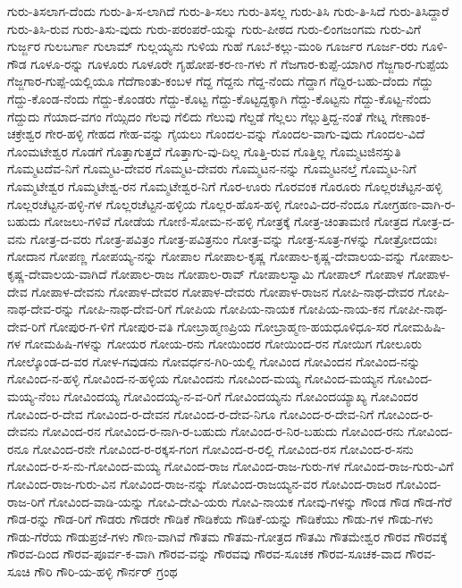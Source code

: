 {ಗುರು-ತಿಸಲಾಗ-ದೆಂದು
ಗುರು-ತಿ-ಸ-ಲಾಗಿದೆ
ಗುರು-ತಿ-ಸಲು
ಗುರು-ತಿಸಲ್ಲ
ಗುರು-ತಿಸಿ
ಗುರು-ತಿ-ಸಿದೆ
ಗುರು-ತಿಸಿದ್ದಾರೆ
ಗುರು-ತಿಸಿ-ರುವ
ಗುರು-ತಿಸು-ವುದು
ಗುರು-ಪರಂಪರೆ-ಯನ್ನು
ಗುರು-ಪೀಠದ
ಗುರು-ಲಿಂಗಜಂಗಮ
ಗುರು-ವಿಗೆ
ಗುರ್ಜ್ಜರ
ಗುಲಬರ್ಗಾ
ಗುಲಾಮ್
ಗುಲ್ಲಯ್ಯನು
ಗುಳಿಯ
ಗುಹೆ
ಗೂಬೆ-ಕಲ್ಲು-ಮಂಠಿ
ಗೂರ್ಜರ
ಗೂರ್ಜ-ರರು
ಗೂಳಿ-ಗೌಡ
ಗೂಳೂ-ರನ್ನು
ಗೂಳೂರು
ಗೂಳೂರೇ
ಗೃಹೋಪ-ಕರ-ಣ-ಗಳು
ಗೆ
ಗೆಜಗಾರ-ಕುಪ್ಪೆ-ಯಾಗಿರ
ಗೆಜ್ಜಗಾರ-ಗುಪ್ಪೆಯ
ಗೆಜ್ಜಗಾರ-ಗುಪ್ಪೆ-ಯಲ್ಲಿಯೂ
ಗೆದೆಗಾಂತು-ಕಂಬಳ
ಗೆದ್ದ
ಗೆದ್ದನು
ಗೆದ್ದ-ನೆಂದು
ಗೆದ್ದಾಗ
ಗೆದ್ದಿರ-ಬಹು-ದೆಂದು
ಗೆದ್ದು
ಗೆದ್ದು-ಕೊಂಡ-ನೆಂದು
ಗೆದ್ದು-ಕೊಂಡರು
ಗೆದ್ದು-ಕೊಟ್ಟ
ಗೆದ್ದು-ಕೊಟ್ಟದ್ದಕ್ಕಾಗಿ
ಗೆದ್ದು-ಕೊಟ್ಟನು
ಗೆದ್ದು-ಕೊಟ್ಟ-ನೆಂದು
ಗೆದ್ದುದು
ಗೆಯಾದ-ವಗಂ
ಗೆಯ್ಸಿದಂ
ಗೆಲವು
ಗೆಲಿದು
ಗೆಲುವು
ಗೆಲ್ದಡೆ
ಗೆಲ್ಲಲು
ಗೆಲ್ಲುತ್ತಿದ್ದ-ನಂತೆ
ಗೇಟ್ನ
ಗೇಣಾಂಕ-ಚಕ್ರೇಶ್ವರ
ಗೇರ-ಹಳ್ಳಿ
ಗೇಹದ
ಗೇಹ-ವನ್ನು
ಗೈಯಲು
ಗೊಂದಲ-ವನ್ನು
ಗೊಂದಲ-ವಾಗು-ವುದು
ಗೊಂದಲ-ವಿದೆ
ಗೊಂಮಟೇಶ್ವರ
ಗೊಡಗೆ
ಗೊತ್ತಾಗುತ್ತದೆ
ಗೊತ್ತಾಗು-ವು-ದಿಲ್ಲ
ಗೊತ್ತಿ-ರುವ
ಗೊತ್ತಿಲ್ಲ
ಗೊಮ್ಮಟಜಿನಸ್ತುತಿ
ಗೊಮ್ಮಟದೆವ-ನಿಗೆ
ಗೊಮ್ಮಟ-ದೇವರ
ಗೊಮ್ಮಟ-ದೇವರು
ಗೊಮ್ಮಟನ-ನನ್ನು
ಗೊಮ್ಮಟನಲ್ತೆ
ಗೊಮ್ಮಟ-ನಿಗೆ
ಗೊಮ್ಮಟೇಶ್ವರ
ಗೊಮ್ಮಟೇಶ್ವ-ರನ
ಗೊಮ್ಮಟೇಶ್ವರ-ನಿಗೆ
ಗೊರ-ಊರು
ಗೊರವಂಕ
ಗೊರೂರು
ಗೊಲ್ಲರಚೆಟ್ಟನ-ಹಳ್ಳಿ
ಗೊಲ್ಲರಚೆಟ್ಟನ-ಹಳ್ಳಿ-ಗಳ
ಗೊಲ್ಲರಚೆಟ್ಟನ-ಹಳ್ಳಿಯ
ಗೊಲ್ಲರ-ಹೊಸ-ಹಳ್ಳಿ
ಗೋಂವಿ-ದರ-ನೆಂದೂ
ಗೋಗ್ರಹಣ-ವಾಗಿ-ರ-ಬಹುದು
ಗೋಜಲು-ಗಳಿವೆ
ಗೋಡೆಯ
ಗೋಣಿ-ಸೋಮ-ನ-ಹಳ್ಳಿ
ಗೋತ್ರಕ್ಕೆ
ಗೋತ್ರ-ಚಿಂತಾಮಣಿ
ಗೋತ್ರದ
ಗೋತ್ರ-ದ-ವನು
ಗೋತ್ರ-ದ-ವರು
ಗೋತ್ರ-ಪವಿತ್ರಂ
ಗೋತ್ರ-ಪವಿತ್ರನುಂ
ಗೋತ್ರ-ವನ್ನು
ಗೋತ್ರ-ಸೂತ್ರ-ಗಳನ್ನು
ಗೋತ್ರೋದಯಃ
ಗೋದಾನ
ಗೋಪಣ್ಣ
ಗೋಪಯ್ಯ-ನನ್ನು
ಗೋಪಾಲ
ಗೋಪಾಲ-ಕೃಷ್ಣ
ಗೋಪಾಲ-ಕೃಷ್ಣ-ದೇವಾಲಯ-ವನ್ನು
ಗೋಪಾಲ-ಕೃಷ್ಣ-ದೇವಾಲಯ-ವಾಗಿದೆ
ಗೋಪಾಲ-ರಾಜ
ಗೋಪಾಲ-ರಾವ್
ಗೋಪಾಲಸ್ವಾಮಿ
ಗೋಪಾಲ್
ಗೋಪಾಳ
ಗೋಪಾಳ-ದೇವ
ಗೋಪಾಳ-ದೇವನು
ಗೋಪಾಳ-ದೇವರ
ಗೋಪಾಳ-ದೇವರು
ಗೋಪಾಳ-ರಾಜನ
ಗೋಪಿ-ನಾಥ-ದೇವರ
ಗೋಪಿ-ನಾಥ-ದೇವ-ರನ್ನು
ಗೋಪಿ-ನಾಥ-ದೇವ-ರಿಗೆ
ಗೋಪಿಯ
ಗೋಪಿಯ-ನಾಯಕ
ಗೋಪಿಯ-ನಾಯ-ಕನ
ಗೋಪೀ-ನಾಥ-ದೇವ-ರಿಗೆ
ಗೋಪುರ-ಗ-ಳಿಗೆ
ಗೋಪುರ-ವತಿ
ಗೋಬ್ರಾಹ್ಮಣಪ್ರಿಯ
ಗೋಬ್ರಾಹ್ಮಣ-ಹಯಧೂಳಿಧೂ-ಸರ
ಗೋಮಹಿಷಿ-ಗಳ
ಗೋಮಹಿಷಿ-ಗಳನ್ನು
ಗೋಯರ
ಗೋಯ-ರನು
ಗೋಯಿಂದರ
ಗೋಯಿಂದ-ರನ
ಗೋಯಿಗ
ಗೋಲೂರು
ಗೋಲ್ಕೊಂಡ-ದ-ವರ
ಗೋಳ-ಗವುಡನು
ಗೋವರ್ಧನ-ಗಿರಿ-ಯಲ್ಲಿ
ಗೋವಿಂದ
ಗೋವಿಂದನ
ಗೋವಿಂದ-ನನ್ನು
ಗೋವಿಂದ-ನ-ಹಳ್ಳಿ
ಗೋವಿಂದ-ನ-ಹಳ್ಳಿಯ
ಗೋವಿಂದನು
ಗೋವಿಂದ-ಮಯ್ಯ
ಗೋವಿಂದ-ಮಯ್ಯನ
ಗೋವಿಂದ-ಮಯ್ಯ-ನೆಂಬ
ಗೋವಿಂದಯ್ಯ
ಗೋವಿಂದಯ್ಯ-ನ-ವ-ರಿಗೆ
ಗೋವಿಂದಯ್ಯನು
ಗೋವಿಂದಯ್ಯಾಖ್ಯ
ಗೋವಿಂದರ
ಗೋವಿಂದ-ರ-ದೇವ
ಗೋವಿಂದ-ರ-ದೇವನ
ಗೋವಿಂದ-ರ-ದೇವ-ನಿಗೂ
ಗೋವಿಂದ-ರ-ದೇವ-ನಿಗೆ
ಗೋವಿಂದ-ರ-ದೇವನು
ಗೋವಿಂದ-ರನ
ಗೋವಿಂದ-ರ-ನಾಗಿ-ರ-ಬಹುದು
ಗೋವಿಂದ-ರ-ನಿರ-ಬಹುದು
ಗೋವಿಂದ-ರನು
ಗೋವಿಂದ-ರನೂ
ಗೋವಿಂದ-ರನೇ
ಗೋವಿಂದ-ರ-ರಕ್ಕಸ-ಗಂಗ
ಗೋವಿಂದ-ರ-ರಲ್ಲಿ
ಗೋವಿಂದ-ರಸ
ಗೋವಿಂದ-ರ-ಸನು
ಗೋವಿಂದ-ರ-ಸ-ನು-ಗೋವಿಂದ-ಮಯ್ಯ
ಗೋವಿಂದ-ರಾಜ
ಗೋವಿಂದ-ರಾಜ-ಗುರು-ಗಳ
ಗೋವಿಂದ-ರಾಜ-ಗುರು-ವಿಗೆ
ಗೋವಿಂದ-ರಾಜ-ಗುರು-ವಿನ
ಗೋವಿಂದ-ರಾಜ-ನನ್ನು
ಗೋವಿಂದ-ರಾಜಯ್ಯನ-ವರ
ಗೋವಿಂದ-ರಾಜರ
ಗೋವಿಂದ-ರಾಜ-ರಿಗೆ
ಗೋವಿಂದ-ವಾಡಿ-ಯನ್ನು
ಗೋವಿ-ದೇವಿ-ಯರು
ಗೋವಿ-ನಾಯಕ
ಗೋವು-ಗಳನ್ನು
ಗೌಂಡ
ಗೌಡ
ಗೌಡ-ಗೆರೆ
ಗೌಡ-ರನ್ನು
ಗೌಡ-ರಿಗೆ
ಗೌಡರು
ಗೌಡರೇ
ಗೌಡಿಕೆ
ಗೌಡಿಕೆಯ
ಗೌಡಿಕೆ-ಯನ್ನು
ಗೌಡಿಕೆಯು
ಗೌಡು-ಗಳ
ಗೌಡು-ಗಳು
ಗೌಡು-ಗೆರೆಯ
ಗೌಡುಪ್ರಜೆ-ಗಳು
ಗೌಣ-ವಾಗಿವೆ
ಗೌತಮ
ಗೌತಮ-ಗೋತ್ರದ
ಗೌತಮಿ
ಗೌತಮೇಶ್ವರ
ಗೌರವ
ಗೌರವಕ್ಕೆ
ಗೌರವ-ದಿಂದ
ಗೌರವ-ಪೂರ್ವ-ಕ-ವಾಗಿ
ಗೌರವ-ವನ್ನು
ಗೌರವವು
ಗೌರವ-ಸೂಚಕ
ಗೌರವ-ಸೂಚಕ-ವಾದ
ಗೌರವ-ಸೂಚಿ
ಗೌರಿ
ಗೌರಿ-ಯ-ಹಳ್ಳಿ
ಗೌರ್ನರ್
ಗ್ರಂಥ
}
